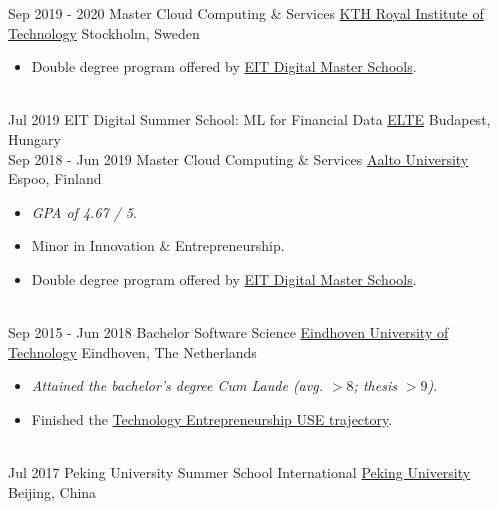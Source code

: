 \documentclass[a4paper]{twentysecondcv} %
\begin{document}
\begin{twenty} %
    \twentyitem
    	{Sep 2019 - }
        {2020}
        {Master Cloud Computing \& Services}
        {\href{https://kth.se/en}{KTH Royal Institute of Technology}}
        {Stockholm, Sweden}
        {
        \begin{itemize}
            \item Double degree program offered by \href{https://masterschool.eitdigital.eu/}{EIT Digital Master Schools}.
        \end{itemize}
        }
    \\
	\twentyitem
    	{Jul 2019}
		{}
        {EIT Digital Summer School: ML for Financial Data}
        {\href{https://www.elte.hu/en/}{ELTE}}
        {Budapest, Hungary}
        {
    	}
    \\
	\twentyitem
    	{Sep 2018 - }
        {Jun 2019}
        {Master Cloud Computing \& Services}
        {\href{https://www.aalto.fi/en}{Aalto University}}
        {Espoo, Finland}
        {
        \begin{itemize}
            \item \emph{GPA of 4.67 / 5}.
            \item Minor in Innovation \& Entrepreneurship.
            \item Double degree program offered by \href{https://masterschool.eitdigital.eu/}{EIT Digital Master Schools}.
        \end{itemize}
        }
    \\
    \twentyitem
    	{Sep 2015 - }
        {Jun 2018}
        {Bachelor Software Science}
        {\href{https://tue.nl/}{Eindhoven University of Technology}}
        {Eindhoven, The Netherlands}
        {
       	\begin{itemize}
   			\item \emph{Attained the bachelor's degree Cum Laude (avg. $> 8$; thesis $> 9$)}.
            \item Finished the \href{https://educationguide.tue.nl/programs/bachelor-college/use-learning-trajectory/technology-entrepreneurship/}{Technology Entrepreneurship USE trajectory}.
		\end{itemize}
    	}
    \\
	\twentyitem
    	{Jul 2017}
		{}
        {Peking University Summer School International}
        {\href{http://www.oir.pku.edu.cn/summerschool/}{Peking University}}
        {Beijing, China}
        {
    	}
\end{twenty}
\end{document}
